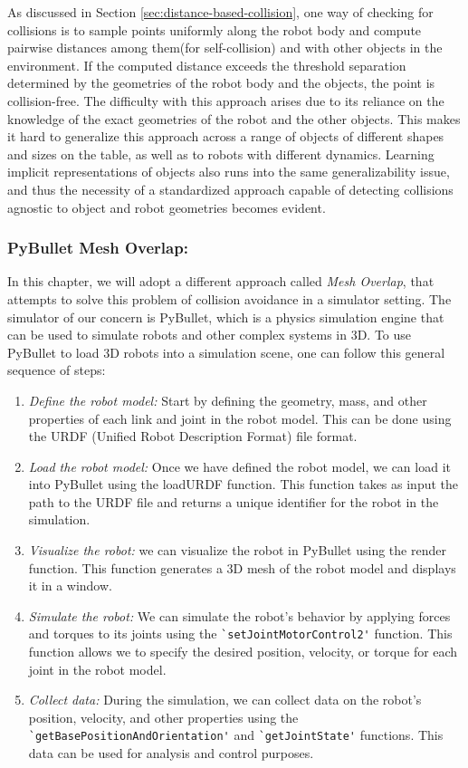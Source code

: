 As discussed in Section \ref{sec:distance-based-collision}, one way of checking for collisions is to sample points uniformly along the robot body and compute pairwise distances among them(for self-collision) and with other objects in the environment. If the computed distance exceeds the threshold separation determined by the geometries of the robot body and the objects, the point is collision-free. The difficulty with this approach arises due to its reliance on the knowledge of the exact geometries of the robot and the other objects. This makes it hard to generalize this approach across a range of objects of different shapes and sizes on the table, as well as to robots with different dynamics. Learning implicit representations of objects also runs into the same generalizability issue, and thus the necessity of a standardized approach capable of detecting collisions agnostic to object and robot geometries becomes evident. 

\subsubsection{PyBullet Mesh Overlap:}
In this chapter, we will adopt a different approach called 
\textit{Mesh Overlap}, that attempts to solve this problem of collision avoidance in a simulator setting. The simulator of our concern is PyBullet, which is a physics simulation engine that can be used to simulate robots and other complex systems in 3D. To use PyBullet to load 3D robots into a simulation scene, one can follow this  general sequence of steps:

\begin{enumerate}
    \item \textit{Define the robot model:} Start by defining the geometry, mass, and other properties of each link and joint in the robot model. This can be done using the URDF (Unified Robot Description Format) file format.
    \item \textit{Load the robot model:} Once we have defined the robot model, we can load it into PyBullet using the loadURDF function. This function takes as input the path to the URDF file and returns a unique identifier for the robot in the simulation.
    \item \textit{Visualize the robot:}\label{point:vis_robot} we can visualize the robot in PyBullet using the render function. This function generates a 3D mesh of the robot model and displays it in a window.
    \item \textit{Simulate the robot:} We can simulate the robot's behavior by applying forces and torques to its joints using the \verb_`setJointMotorControl2'_ function. This function allows we to specify the desired position, velocity, or torque for each joint in the robot model.
    \item \textit{Collect data:} During the simulation, we can collect data on the robot's position, velocity, and other properties using the \verb_`getBasePositionAndOrientation'_ and \verb_`getJointState'_ functions. This data can be used for analysis and control purposes.
\end{enumerate}

